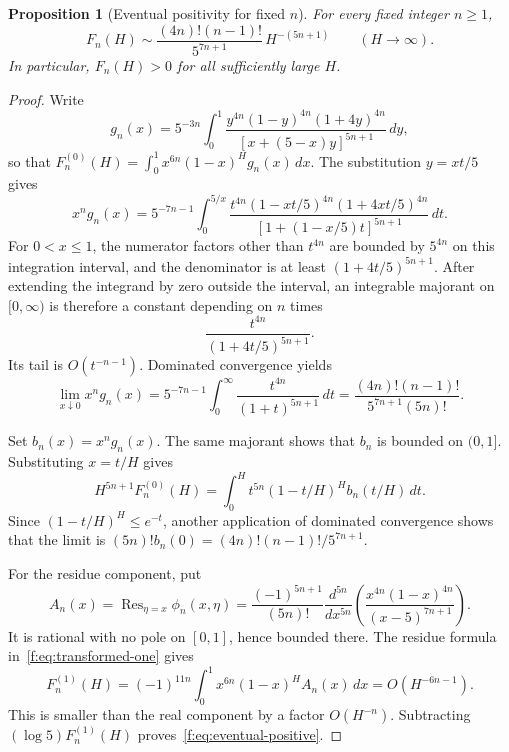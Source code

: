 \documentclass[11pt]{amsart}
\newcommand{\dd}{\,d}
\newcommand{\Res}{\operatorname{Res}}
\theoremstyle{plain}
\newtheorem{proposition}[theorem]{Proposition}
\theoremstyle{remark}\newtheorem{remark}[theorem]{Remark}
\numberwithin{equation}{section}
\begin{document}
\begin{proposition}[Eventual positivity for fixed $n$]\label{f:prop:positivity}
For every fixed integer $n\ge1$,
\begin{equation}\label{f:eq:eventual-positive}
 F_n(H)\sim\frac{(4n)!(n-1)!}{5^{7n+1}}\,H^{-(5n+1)}
 \qquad(H\longrightarrow\infty).
\end{equation}
In particular, $F_n(H)>0$ for all sufficiently large $H$.
\end{proposition}
\begin{proof}
Write
\[
 g_n(x)=5^{-3n}\int_0^1
 \frac{y^{4n}(1-y)^{4n}(1+4y)^{4n}}
 {[x+(5-x)y]^{5n+1}}\dd y,
\]
so that $F_n^{(0)}(H)=\int_0^1x^{6n}(1-x)^Hg_n(x)\dd x$.
The substitution $y=xt/5$ gives
\begin{equation}\label{f:eq:inner-scaling}
 x^ng_n(x)=5^{-7n-1}\int_0^{5/x}
 \frac{t^{4n}(1-xt/5)^{4n}(1+4xt/5)^{4n}}
 {[1+(1-x/5)t]^{5n+1}}\dd t.
\end{equation}
For $0<x\le1$, the numerator factors other than $t^{4n}$ are bounded
by $5^{4n}$ on this integration interval, and the denominator is at
least $(1+4t/5)^{5n+1}$. After extending the integrand by zero outside
the interval, an integrable majorant on $[0,\infty)$ is therefore a
constant depending on $n$ times
\[
 \frac{t^{4n}}{(1+4t/5)^{5n+1}}.
\]
Its tail is $O(t^{-n-1})$. Dominated convergence yields
\begin{equation}\label{f:eq:inner-limit}
 \lim_{x\downarrow0}x^ng_n(x)
 =5^{-7n-1}\int_0^\infty\frac{t^{4n}}{(1+t)^{5n+1}}\dd t
 =\frac{(4n)!(n-1)!}{5^{7n+1}(5n)!}.
\end{equation}

Set $b_n(x)=x^ng_n(x)$. The same majorant shows that $b_n$ is
bounded on $(0,1]$. Substituting $x=t/H$ gives
\[
 H^{5n+1}F_n^{(0)}(H)=
 \int_0^H t^{5n}(1-t/H)^H b_n(t/H)\dd t.
\]
Since $(1-t/H)^H\le e^{-t}$, another application of dominated
convergence shows that the limit is
$(5n)!b_n(0)=(4n)!(n-1)!/5^{7n+1}$.

For the residue component, put
\begin{equation}\label{f:eq:residue-function}
 A_n(x)=\Res_{\eta=x}\phi_n(x,\eta)
 =\frac{(-1)^{5n+1}}{(5n)!}\frac{d^{5n}}{dx^{5n}}
 \left(\frac{x^{4n}(1-x)^{4n}}{(x-5)^{7n+1}}\right).
\end{equation}
It is rational with no pole on $[0,1]$, hence bounded there. The residue
formula in~\eqref{f:eq:transformed-one} gives
\[
 F_n^{(1)}(H)=(-1)^{11n}\int_0^1x^{6n}(1-x)^H A_n(x)\dd x
 =O(H^{-6n-1}).
\]
This is smaller than the real component by a factor $O(H^{-n})$.
Subtracting $(\log5)F_n^{(1)}(H)$ proves~\eqref{f:eq:eventual-positive}.
\end{proof}
\end{document}
